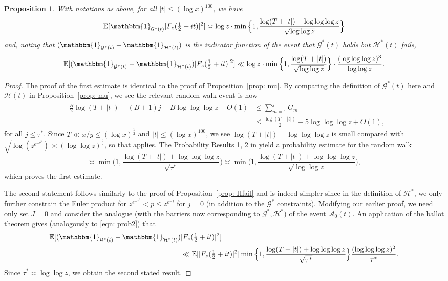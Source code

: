 \documentclass[12pt, notitlepage]{amsart}
\numberwithin{equation}{section}
\def\E{\mathbb E}
\newtheorem{proposition}[theorem]{Proposition}
\theoremstyle{remark}
\theoremstyle{definition}
\theoremstyle{remark}
\numberwithin{equation}{section}
\begin{document}
\begin{proposition}\label{prop: no t}  With notations as above, for all $|t| \leq (\log x)^{100}$, we have
   \[
   \E[\mathbbm{1}_{\mathcal{G}^{*}(t)}|F_z(\tfrac{1}{2} + it)|^{2} ] \asymp \log z \cdot \min \Big\{ 1, \frac{\log(T+|t|) + \log\log\log z}{\sqrt{\log \log z}} \Big\} 
   \]
and, noting that $(\mathbbm{1}_{\mathcal{G}^{*}(t)}-\mathbbm{1}_{\mathcal{H}^{*}(t)})$ is the indicator function of the event that ${\mathcal G}^*(t)$ holds but ${\mathcal H}^*(t)$ fails, 
\[
\E[(\mathbbm{1}_{\mathcal{G}^{*}(t)}-\mathbbm{1}_{\mathcal{H}^{*}(t)})|F_z(\tfrac{1}{2} + it)|^{2} ] \ll \log z \cdot \min \Big\{ 1, \frac{\log (T+|t|)}{\sqrt{\log \log z}} \Big\} \cdot \frac{(\log \log \log z)^{3}}{\log \log z}.
\]  
 \end{proposition}
 \begin{proof}
The proof of the first estimate is identical to the proof of Proposition~\ref{prop: mu}. By comparing the definition of $\mathcal{G}^{*}(t)$ here and $\mathcal{H}(t)$ in Proposition~\ref{prop: mu}, we see the relevant random walk event is now
\begin{align*}
 -\frac{B}{2}\log(T+|t|) - (B+1)j - B\log\log\log z - O(1)& \le \sum_{m=1}^{j}G_m \\
 &\le \frac{\log(T+|t|)}{2} + 5\log\log\log z + O(1), 
 \end{align*}
 for all $j\le \tau^{*}$.
Since $T \ll x/y \leq (\log x)^{\frac 12}$ and $|t| \leq (\log x)^{100}$, we see $\log(T+|t|) + \log\log\log z$ is small compared with $\sqrt{\log (z^{e^{-\tau^{*}}})} \asymp (\log\log z)^{\frac 32}$, so that \cite[Lemma 4]{HarperLow} applies.  The Probability Results 1, 2 in \cite{HarperLow} yield a probability estimate for the random walk 
$$
\asymp \min \Big(1, \frac{\log(T+|t|) + \log\log\log z}{\sqrt{\tau^{*}}}\Big) \asymp \min \Big(1, \frac{\log(T+|t|) + \log\log\log z}{\sqrt{\log \log z}}\Big),
$$ 
which proves the first estimate.  
     
     The second statement follows similarly to the proof of Proposition~\ref{prop: Hfail} and is indeed simpler since in the definition of $\mathcal{H}^{*}$, we only further constrain the Euler product for $z^{e^{-\tau^{*}}} < p \le z^{e^{-j}}$ for $j=0$ (in addition to the $\mathcal{G}^{*}$ constraints).  Modifying our earlier proof, we need only set $J=0$ and consider the analogue (with the barriers now corresponding to $\mathcal{G}^{*}, \mathcal{H}^{*}$) of the event $\mathcal{A}_0(t)$.  An application of the ballot theorem gives (analogously to \eqref{eqn: prob2}) that
  \begin{align*}
  \E[(\mathbbm{1}_{\mathcal{G}^{*}(t)}-\mathbbm{1}_{{\mathcal{H}^{*}(t)} } ) &|F_z(\tfrac{1}{2} + it)|^{2} ] \\
  &\ll \E[|F_z(\tfrac{1}{2} + it)|^{2} ] \min \Big\{ 1, \frac{\log (T+|t|) + \log \log \log z}{\sqrt{\tau^{*}}}\Big\} \frac{(\log \log \log z)^{2}}{\tau^{*}}. 
  \end{align*} 
Since $\tau^{*} \asymp \log \log z$, we obtain the second stated result.   
\end{proof}
\end{document}
